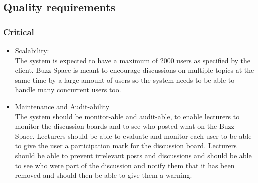 
\subsection{Quality requirements}
	\subsubsection{Critical}
		\begin{itemize}
			\item Scalability: \\
			The system is expected to have a maximum of 2000 users as specified by the client. Buzz Space is meant to encourage discussions on multiple topics at the same time by a large amount of users so the system needs to be able to handle many concurrent users too.
			\item Maintenance and Audit-ability \\
			The system should be monitor-able and audit-able, to enable lecturers to monitor the discussion boards and to see who posted what on the Buzz Space. Lecturers should be able to evaluate and monitor each user to be able to give the user a participation mark for the discussion board. Lecturers should be able to prevent irrelevant posts and discussions and should be able to see who were part of the discussion and notify them that it has been removed and should then be able to give them a warning.
		\end{itemize}
